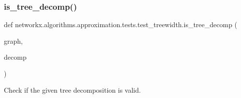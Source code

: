 \subsubsection{\texorpdfstring{is\+\_\+tree\+\_\+decomp()}{is\_tree\_decomp()}}
{\footnotesize\ttfamily def networkx.\+algorithms.\+approximation.\+tests.\+test\+\_\+treewidth.\+is\+\_\+tree\+\_\+decomp (\begin{DoxyParamCaption}\item[{}]{graph,  }\item[{}]{decomp }\end{DoxyParamCaption})}

\begin{DoxyVerb}Check if the given tree decomposition is valid.\end{DoxyVerb}
 